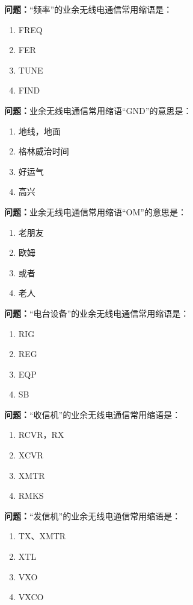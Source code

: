 \documentclass{ctexbook}
\begin{document}
\textbf{问题：}“频率”的业余无线电通信常用缩语是：
\begin{enumerate}[label=\Alph*), leftmargin=3em]
\item FREQ
\item FER
\item TUNE
\item FIND
\end{enumerate}

\textbf{问题：}业余无线电通信常用缩语“GND”的意思是：
\begin{enumerate}[label=\Alph*), leftmargin=3em]
\item 地线，地面
\item 格林威治时间
\item 好运气
\item 高兴
\end{enumerate}

\textbf{问题：}业余无线电通信常用缩语“OM”的意思是：
\begin{enumerate}[label=\Alph*), leftmargin=3em]
\item 老朋友
\item 欧姆
\item 或者
\item 老人
\end{enumerate}

\textbf{问题：}“电台设备”的业余无线电通信常用缩语是：
\begin{enumerate}[label=\Alph*), leftmargin=3em]
\item RIG
\item REG
\item EQP
\item SB
\end{enumerate}

\textbf{问题：}“收信机”的业余无线电通信常用缩语是：
\begin{enumerate}[label=\Alph*), leftmargin=3em]
\item RCVR，RX
\item XCVR
\item XMTR
\item RMKS
\end{enumerate}

\textbf{问题：}“发信机”的业余无线电通信常用缩语是：
\begin{enumerate}[label=\Alph*), leftmargin=3em]
\item TX、XMTR
\item XTL
\item VXO
\item VXCO
\end{enumerate}
\end{document}
